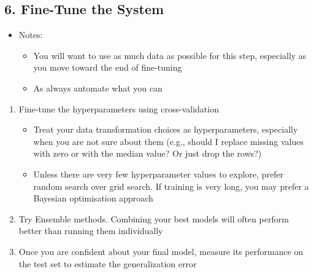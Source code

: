 \begin{slide}
\section[-2]{6. Fine-Tune the System}

\begin{PauseHighLight}\squeeze
  \begin{itemize}
  \item Notes:
    \begin{itemize}
    \item You will want to use as much data as possible for this step,
      especially as you move toward the end of fine-tuning
    \item As always automate what you can\pause
    \end{itemize}
  \end{itemize}
  \begin{enumerate}
  \item Fine-tune the hyperparameters using cross-validation
    \begin{itemize}
    \item Treat your data transformation choices as hyperparameters,
      especially when you are not sure about them (e.g., should I
      replace missing values with zero or with the median value? Or
      just drop the rows?)
    \item Unless there are very few hyperparameter values to explore,
      prefer random search over grid search. If training is very long,
      you may prefer a Bayesian optimisation approach\pause
    \end{itemize}
  \item Try Ensemble methods. Combining your best models will often
    perform better than running them individually\pause
  \item Once you are confident about your final model, measure its
    performance on the test set to estimate the generalization error\pause
  \end{enumerate}
\end{PauseHighLight}

\end{slide}


